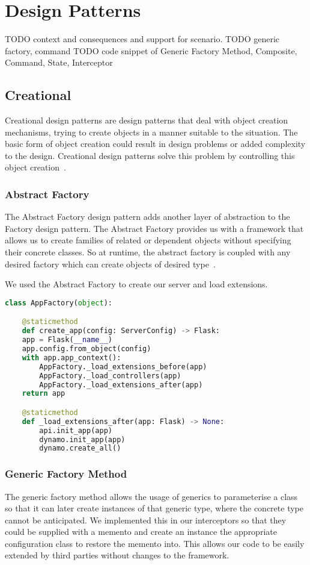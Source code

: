 \chapter{Design Patterns}
TODO context and consequences and support for scenario.
TODO generic factory, command
TODO code snippet of Generic Factory Method, Composite, Command, State, Interceptor

\section{Creational}
Creational design patterns are design patterns that deal with object creation
mechanisms, trying to create objects in a manner suitable to the situation. The basic form of object
creation could result in design problems or added complexity to the design. Creational design patterns
solve this problem by controlling this object creation~\citep{OODesign}.

\subsection{Abstract Factory}
The Abstract Factory design pattern adds another layer of abstraction to the Factory design pattern.
The Abstract Factory provides us with a framework that allows us to create families of related or
dependent objects without specifying their concrete classes. So at runtime, the abstract factory is
coupled with any desired factory which can create objects of desired type~\citep{OODesign}.

We used the Abstract Factory to create our server and load extensions.


\begin{lstlisting}[language=Python]
class AppFactory(object):

	@staticmethod
	def create_app(config: ServerConfig) -> Flask:
	app = Flask(__name__)
	app.config.from_object(config)
	with app.app_context():
		AppFactory._load_extensions_before(app)
		AppFactory._load_controllers(app)
		AppFactory._load_extensions_after(app)
	return app

	@staticmethod
	def _load_extensions_after(app: Flask) -> None:
		api.init_app(app)
		dynamo.init_app(app)
		dynamo.create_all()
\end{lstlisting}


\subsection{Generic Factory Method}
The generic factory method allows the usage of generics to parameterise a class so that it can later create instances
of that generic type, where the concrete type cannot be anticipated. We implemented this in our interceptors so
that they could be supplied with a memento and create an instance the appropriate configuration class to restore the
memento into. This allows our code to be easily extended by third parties without changes to the framework.

